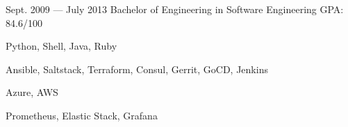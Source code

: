 \documentclass{resume}
\begin{document}
\begin{body}
	{Sept. 2009 --- July 2013}
	{Bachelor of Engineering in Software Engineering}
	{GPA: 84.6/100}
\end{body}

\smallskip


\begin{body}
\begin{description}[style=nextline,leftmargin=8em,topsep=1pt]
	\item[Languages] Python, Shell, Java, Ruby
	\item[Tools] Ansible, Saltstack, Terraform, Consul, Gerrit, GoCD, Jenkins
	\item[Cloud] Azure, AWS
	\item[Monitoring] Prometheus, Elastic Stack, Grafana
\end{description}
\end{body}






%
\end{document}

